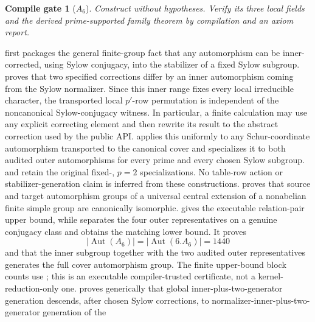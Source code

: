 \documentclass[11pt]{article}
\newtheorem{gate}{Compile gate}
\begin{document}
\begin{gate}[\(A_6\)]
Construct  without
hypotheses.  Verify its three local fields and the derived
prime-supported family theorem by compilation and an axiom report.
\end{gate}

 first packages the general
finite-group fact that any automorphism can be inner-corrected, using Sylow
conjugacy, into the stabilizer of a fixed Sylow subgroup.
 proves that
two specified corrections differ by an inner automorphism coming from the
Sylow normalizer.  Since this inner range fixes every local irreducible
character, the transported local \(p'\)-row permutation is independent of
the noncanonical Sylow-conjugacy witness.  In particular, a finite
calculation may use any explicit correcting element and then rewrite its
result to the abstract correction used by the public API.
 applies
this uniformly to any Schur-coordinate automorphism transported to the
canonical cover and specializes it to both audited outer automorphisms for
every prime and every chosen Sylow subgroup.
 and
 retain the original
fixed-, \(p=2\) specializations.  No table-row action or
stabilizer-generation claim is inferred from these constructions.
 proves that source
and target automorphism groups of a universal central extension of a
nonabelian finite simple group are canonically isomorphic.
 gives the executable
relation-pair upper bound, while
 separates the four outer
representatives on a genuine conjugacy class and obtains the matching
lower bound.  It proves
\[
  \lvert\operatorname{Aut}(A_6)\rvert
  =\lvert\operatorname{Aut}(6.A_6)\rvert=1440
\]
and that the inner subgroup together with the two audited outer
representatives generates the full cover automorphism group.  The finite
upper-bound block counts use ; this is an executable
compiler-trusted certificate, not a kernel-reduction-only one.
 proves generically that global
inner-plus-two-generator generation descends, after chosen Sylow
corrections, to normalizer-inner-plus-two-generator generation of the
\end{document}
